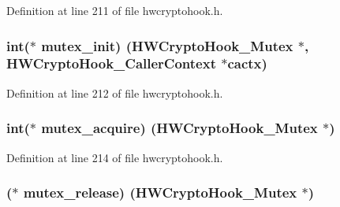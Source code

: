 Definition at line 211 of file hwcryptohook.\+h.

\subsubsection[{\texorpdfstring{mutex\+\_\+init}{mutex_init}}]{\setlength{\rightskip}{0pt plus 5cm}int($\ast$ mutex\+\_\+init) ({\bf H\+W\+Crypto\+Hook\+\_\+\+Mutex} $\ast$, {\bf H\+W\+Crypto\+Hook\+\_\+\+Caller\+Context} $\ast$cactx)}\hypertarget{struct_h_w_crypto_hook___init_info_aed2191c7438350c90cb51091938bf2ba}{}\label{struct_h_w_crypto_hook___init_info_aed2191c7438350c90cb51091938bf2ba}


Definition at line 212 of file hwcryptohook.\+h.

\subsubsection[{\texorpdfstring{mutex\+\_\+acquire}{mutex_acquire}}]{\setlength{\rightskip}{0pt plus 5cm}int($\ast$ mutex\+\_\+acquire) ({\bf H\+W\+Crypto\+Hook\+\_\+\+Mutex} $\ast$)}\hypertarget{struct_h_w_crypto_hook___init_info_a4fc118915dbbf7812b7eb392a9793c02}{}\label{struct_h_w_crypto_hook___init_info_a4fc118915dbbf7812b7eb392a9793c02}


Definition at line 214 of file hwcryptohook.\+h.

\subsubsection[{\texorpdfstring{mutex\+\_\+release}{mutex_release}}]{($\ast$ mutex\+\_\+release) ({\bf H\+W\+Crypto\+Hook\+\_\+\+Mutex} $\ast$)}\hypertarget{struct_h_w_crypto_hook___init_info_afd3c112e66afdba48c1b93c45688efd1}{}\label{struct_h_w_crypto_hook___init_info_afd3c112e66afdba48c1b93c45688efd1}


